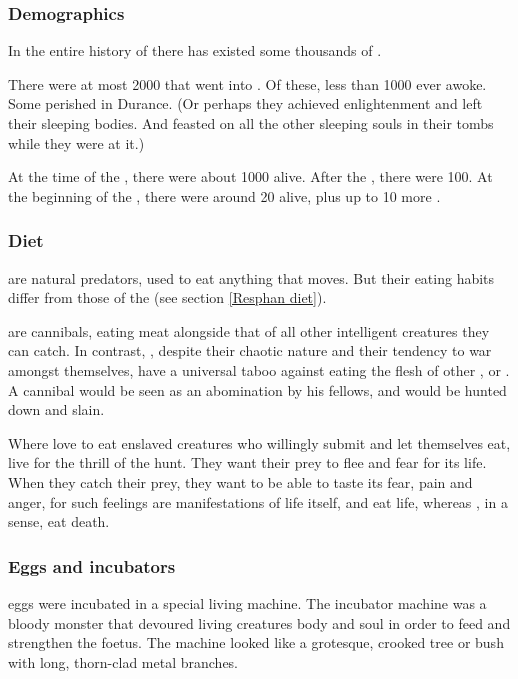 \subsubsection{Demographics}
In the entire history of \Miith there has existed some thousands of \dragons. 

There were at most 2000 \dragons that went into . 
Of these, less than 1000 ever awoke. 
Some perished in Durance. 
(Or perhaps they achieved enlightenment and left their sleeping bodies. 
 And feasted on all the other sleeping souls in their tombs while they were at it.)
 
At the time of the , there were about 1000 \dragons alive.
After the , there were 100. 
At the beginning of the \thirdbanewar, there were around 20 \dragons alive, plus up to 10 more . 





\subsubsection{Diet}
\Dragons{} are natural predators, used to eat anything that moves. But their eating habits differ from those of the \resphain{} (see section \ref{Resphan diet}). 

\Resphain{} are cannibals, eating \resphan{} meat alongside that of all other intelligent creatures they can catch. In contrast, \dragons, despite their chaotic nature and their tendency to war amongst themselves, have a universal taboo against eating the flesh of other \dragons{}, \ophidians{} or \rachyth. A cannibal \dragon{} would be seen as an abomination by his fellows, and would be hunted down and slain. 

Where \resphain{} love to eat enslaved creatures who willingly submit and let themselves eat, \dragons{} live for the thrill of the hunt. They want their prey to flee and fear for its life. When they catch their prey, they want to be able to taste its fear, pain and anger, for such feelings are manifestations of life itself, and \dragons{} eat life, whereas \resphain, in a sense, eat death. 





\subsubsection{Eggs and incubators}
\Draconian eggs were incubated in a special living machine. 
The incubator machine was a bloody monster that devoured living creatures body and soul in order to feed and strengthen the \draconian foetus. 
The machine looked like a grotesque, crooked tree or bush with long, thorn-clad metal branches. 

